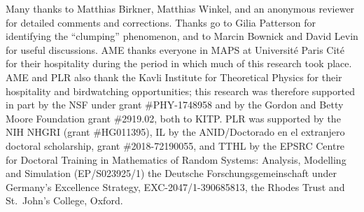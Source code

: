\documentclass[EJP]{ejpecp} %
\begin{document}
\begin{acks}
Many thanks to Matthias Birkner, Matthias Winkel, and an anonymous reviewer
for detailed comments and corrections.
Thanks go to Gilia Patterson for identifying the ``clumping'' phenomenon,
and to Marcin Bownick and David Levin for useful discussions.
AME thanks everyone in MAPS at Universit\'e Paris Cit\'e for their hospitality
during the period in which much of this research took place.
AME and PLR also thank the Kavli Institute for Theoretical Physics
for their hospitality and birdwatching opportunities;
this research was therefore supported in part by the NSF under grant \#PHY-1748958
and by the Gordon and Betty Moore Foundation grant \#2919.02, both to KITP.
PLR was supported by the NIH NHGRI (grant \#HG011395),
IL by the ANID/Doctorado en el extranjero doctoral scholarship, grant \#2018-72190055,
and TTHL by the EPSRC Centre for Doctoral Training in Mathematics of Random Systems: Analysis, Modelling and Simulation (EP/S023925/1)
the Deutsche Forschungsgemeinschaft under Germany's Excellence Strategy, EXC-2047/1-390685813,
the Rhodes Trust and St.~John's College, Oxford.
\end{acks}



\PAGEEND{\thepage}
\end{document}

